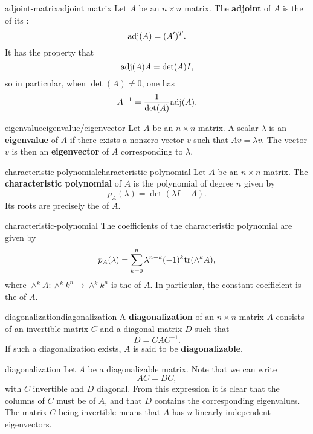 \begin{topic}{adjoint-matrix}{adjoint matrix}
    Let $A$ be an $n \times n$ matrix. The \textbf{adjoint} of $A$ is the  of its :
    \[ \textup{adj}(A) = (A')^T . \]
    It has the property that
    \[ \textup{adj}(A) A = \det(A) I , \]
    so in particular, when $\det(A) \ne 0$, one has
    \[ A^{-1} = \frac{1}{\det(A)} \textup{adj}(A) . \]
\end{topic}

\begin{topic}{eigenvalue}{eigenvalue/eigenvector}
    Let $A$ be an $n \times n$ matrix. A scalar $\lambda$ is an \textbf{eigenvalue} of $A$ if there exists a nonzero vector $v$ such that $A v = \lambda v$. The vector $v$ is then an \textbf{eigenvector} of $A$ corresponding to $\lambda$.
\end{topic}

\begin{topic}{characteristic-polynomial}{characteristic polynomial}
    Let $A$ be an $n \times n$ matrix. The \textbf{characteristic polynomial} of $A$ is the polynomial of degree $n$ given by
    \[ p_A(\lambda) = \det(\lambda I - A) . \]
    Its roots are precisely the  of $A$.
\end{topic}

\begin{example}{characteristic-polynomial}
    The coefficients of the characteristic polynomial are given by
    \[ p_A(\lambda) = \sum_{k = 0}^{n} \lambda^{n - k} (-1)^k \textup{tr}(\wedge^k A) , \]
    where $\wedge^k A : \wedge^k k^n \to \wedge^k k^n$ is the  of $A$.
    In particular, the constant coefficient is the  of $A$.
\end{example}

\begin{topic}{diagonalization}{diagonalization}
    A \textbf{diagonalization} of an $n \times n$ matrix $A$ consists of an invertible matrix $C$ and a diagonal matrix $D$ such that
    \[ D = C A C^{-1} . \]
    If such a diagonalization exists, $A$ is said to be \textbf{diagonalizable}.
\end{topic}

\begin{example}{diagonalization}
    Let $A$ be a diagonalizable matrix. Note that we can write
    \[ AC = DC , \]
    with $C$ invertible and $D$ diagonal. From this expression it is clear that the columns of $C$ must be  of $A$, and that $D$ contains the corresponding eigenvalues. The matrix $C$ being invertible means that $A$ has $n$ linearly independent eigenvectors.
\end{example}

